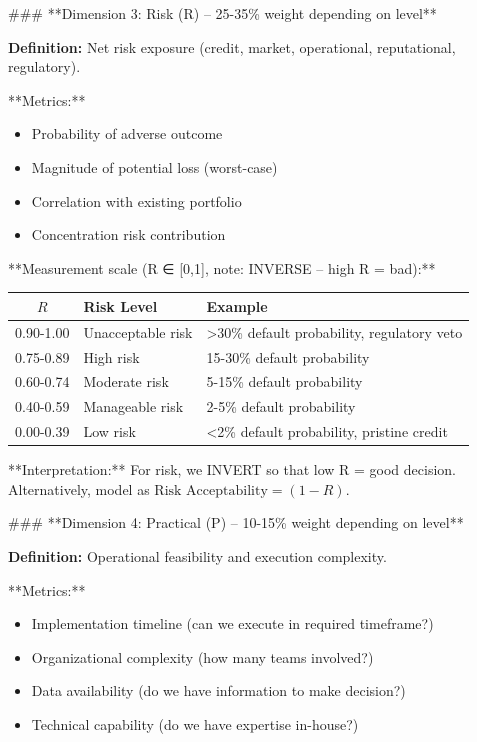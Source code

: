 \documentclass[11pt]{article}
\begin{document}
### **Dimension 3: Risk (R) – 25-35\% weight depending on level**

\textbf{Definition:} Net risk exposure (credit, market, operational, reputational, regulatory).

**Metrics:**
\begin{itemize}
\item Probability of adverse outcome
\item Magnitude of potential loss (worst-case)
\item Correlation with existing portfolio
\item Concentration risk contribution
\end{itemize}

**Measurement scale (R ∈ [0,1], note: INVERSE – high R = bad):**
\begin{table}[h]
\centering
\begin{tabular}{|c|l|l|}
\hline
$R$ & \textbf{Risk Level} & \textbf{Example} \\
\hline
0.90-1.00 & Unacceptable risk & >30\% default probability, regulatory veto \\
0.75-0.89 & High risk & 15-30\% default probability \\
0.60-0.74 & Moderate risk & 5-15\% default probability \\
0.40-0.59 & Manageable risk & 2-5\% default probability \\
0.00-0.39 & Low risk & <2\% default probability, pristine credit \\
\hline
\end{tabular}
\end{table}

**Interpretation:** For risk, we INVERT so that low R = good decision. Alternatively, model as $\text{Risk Acceptability} = (1 - R)$.

### **Dimension 4: Practical (P) – 10-15\% weight depending on level**

\textbf{Definition:} Operational feasibility and execution complexity.

**Metrics:**
\begin{itemize}
\item Implementation timeline (can we execute in required timeframe?)
\item Organizational complexity (how many teams involved?)
\item Data availability (do we have information to make decision?)
\item Technical capability (do we have expertise in-house?)
\end{itemize}
\end{document}
